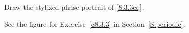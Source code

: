 \documentclass{ximera}
\begin{document}
\begin{computerExercise} \label{c8.4.4}
Draw the stylized phase portrait of \eqref{8.3.3eq}.

\begin{solution}
See the figure for Exercise~\ref{c8.3.3} in
Section~\ref{S:periodic}.

\end{solution}
\end{computerExercise}
\end{document}
